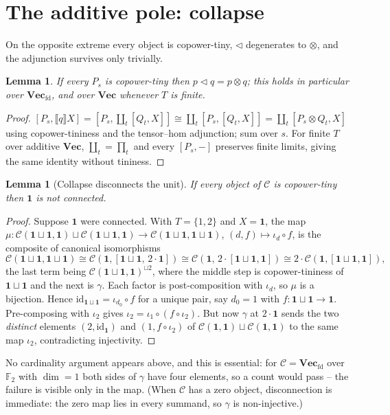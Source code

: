 \documentclass[11pt]{amsart}
\theoremstyle{plain}
\newtheorem{lemma}[theorem]{Lemma}
\theoremstyle{definition}
\newcommand{\C}{\mathcal{C}}
\newcommand{\ext}[1]{\llbracket #1 \rrbracket}
\newcommand{\Vecb}{\mathbf{Vec}}
\newcommand{\Vecfd}{\mathbf{Vec}_{\mathrm{fd}}}
\newcommand{\comp}{\mathbin{\triangleleft}}
\newcommand{\one}{\mathbf{1}}
\begin{document}
\section{The additive pole: collapse}\label{sec:collapse}

On the opposite extreme every object is copower-tiny, $\comp$ degenerates to $\otimes$, and the
adjunction survives only trivially.

\begin{lemma}\label{lem:collapse-tensor}
If every $P_s$ is copower-tiny then $p\comp q=p\otimes q$; this holds in particular over $\Vecfd$, and
over $\Vecb$ whenever $T$ is finite.
\end{lemma}
\begin{proof}
$[P_s,\ext q X]=[P_s,\coprod_t[Q_t,X]]\cong\coprod_t[P_s,[Q_t,X]]=\coprod_t[P_s\otimes Q_t,X]$ using
copower-tininess and the tensor--hom adjunction; sum over $s$. For finite $T$ over additive $\Vecb$,
$\coprod_t=\prod_t$ and every $[P_s,-]$ preserves finite limits, giving the same identity without
tininess.
\end{proof}

\begin{lemma}[Collapse disconnects the unit]\label{lem:D}
If every object of $\C$ is copower-tiny then $\one$ is not connected.
\end{lemma}
\begin{proof}
Suppose $\one$ were connected. With $T=\{1,2\}$ and $X=\one$, the map
$\mu:\C(\one\sqcup\one,\one)\sqcup\C(\one\sqcup\one,\one)\to\C(\one\sqcup\one,\one\sqcup\one)$,
$(d,f)\mapsto\iota_d\circ f$, is the composite of canonical isomorphisms
\[
   \C(\one\sqcup\one,\one\sqcup\one)\cong\C(\one,[\one\sqcup\one,\,2\cdot\one])
   \cong\C(\one,\,2\cdot[\one\sqcup\one,\one])
   \cong 2\cdot\C(\one,[\one\sqcup\one,\one]),
\]
the last term being $\C(\one\sqcup\one,\one)^{\sqcup 2}$,
where the middle step is copower-tininess of $\one\sqcup\one$ and the next is $\gamma$. Each factor is
post-composition with $\iota_d$, so $\mu$ is a bijection. Hence $\mathrm{id}_{\one\sqcup\one}=
\iota_{d_0}\circ f$ for a unique pair, say $d_0=1$ with $f:\one\sqcup\one\to\one$. Pre-composing with
$\iota_2$ gives $\iota_2=\iota_1\circ(f\circ\iota_2)$. But now $\gamma$ at $2\cdot\one$ sends the two
\emph{distinct} elements $(2,\mathrm{id}_{\one})$ and $(1,f\circ\iota_2)$ of
$\C(\one,\one)\sqcup\C(\one,\one)$ to the same map $\iota_2$, contradicting injectivity.
\end{proof}

No cardinality argument appears above, and this is essential: for $\C=\Vecfd$ over $\mathbb F_2$ with
$\dim=1$ both sides of $\gamma$ have four elements, so a count would pass -- the failure is visible
only in the map. (When $\C$ has a zero object, disconnection is immediate: the zero map lies in every
summand, so $\gamma$ is non-injective.)
\end{document}
